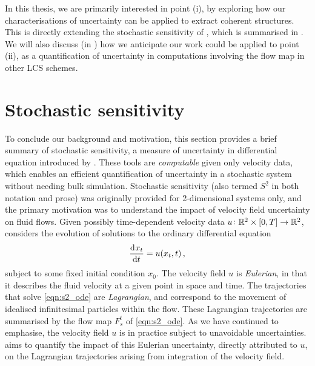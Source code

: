 In this thesis, we are primarily interested in point (i), by exploring how our characterisations of uncertainty can be applied to extract coherent structures.
This is directly extending the stochastic sensitivity of \citet{Balasuriya_2020_StochasticSensitivityComputable}, which is summarised in .
We will also discuss (in ) how we anticipate our work could be applied to point (ii), as a quantification of uncertainty in computations involving the flow map in other LCS schemes.




\section{Stochastic sensitivity}\label{sec:s2_summ}
To conclude our background and motivation, this section provides a brief summary of stochastic sensitivity, a measure of uncertainty in differential equation introduced by \citet{Balasuriya_2020_StochasticSensitivityComputable}.
These tools are \emph{computable} given only velocity data, which enables an efficient quantification of uncertainty in a stochastic system without needing bulk simulation.
Stochastic sensitivity (also termed \(S^2\) in both notation and prose) was originally provided for 2-dimensional systems only, and the primary motivation was to understand the impact of velocity field uncertainty on fluid flows.
Given possibly time-dependent velocity data \(u\colon \mathbb{R}^2 \times [0,T] \to \mathbb{R}^2\), \citet{Balasuriya_2020_StochasticSensitivityComputable} considers the evolution of solutions to the ordinary differential equation
\begin{equation}\label{eqn:s2_ode}
	\dod{x_t}{t} = u\!\left(x_t, t\right),
\end{equation}
subject to some fixed initial condition \(x_0\).
The velocity field \(u\) is \emph{Eulerian}, in that it describes the fluid velocity at a given point in space and time.
The trajectories that solve \cref{eqn:s2_ode} are \emph{Lagrangian}, and correspond to the movement of idealised infinitesimal particles within the flow.
These Lagrangian trajectories are summarised by the flow map \(F_s^t\) of \cref{eqn:s2_ode}.
As we have continued to emphasise, the velocity field \(u\) is in practice subject to unavoidable uncertainties.
\citet{Balasuriya_2020_StochasticSensitivityComputable} aims to quantify the impact of this Eulerian uncertainty, directly attributed to \(u\), on the Lagrangian trajectories arising from integration of the velocity field.

